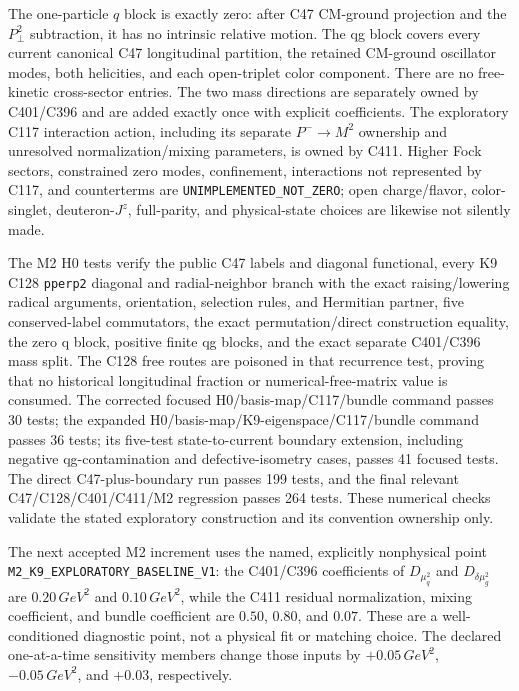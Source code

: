 \documentclass[11pt,oneside]{book}
\newcommand{\codepath}[1]{\nolinkurl{#1}}
\begin{document}
The one-particle $q$ block is exactly zero: after C47 CM-ground projection and
the $P_\perp^2$ subtraction, it has no intrinsic relative motion. The qg
block covers every current canonical C47 longitudinal partition, the retained
CM-ground oscillator modes, both helicities, and each open-triplet color
component. There are no free-kinetic cross-sector entries. The two mass
directions are separately owned by C401/C396 and are added exactly once with
explicit coefficients. The exploratory C117 interaction action, including
its separate $P^-\!\to M^2$ ownership and unresolved normalization/mixing
parameters, is owned by C411. Higher Fock sectors, constrained zero modes,
confinement, interactions not represented by C117, and counterterms are
\texttt{UNIMPLEMENTED\_NOT\_ZERO}; open charge/flavor, color-singlet,
deuteron-$J^z$, full-parity, and physical-state choices are likewise not
silently made.

The M2 H0 tests verify the public C47 labels and diagonal functional, every K9
C128 \codepath{pperp2} diagonal and radial-neighbor branch with the exact
raising/lowering radical arguments, orientation, selection rules, and
Hermitian partner, five conserved-label commutators, the exact
permutation/direct construction equality, the zero q block, positive finite
qg blocks, and the exact separate C401/C396 mass split. The C128 free routes
are poisoned in that recurrence test, proving that no historical longitudinal
fraction or numerical-free-matrix value is consumed. The corrected focused H0/basis-map/C117/bundle command
passes 30 tests; the expanded H0/basis-map/K9-eigenspace/C117/bundle command
passes 36 tests; its five-test state-to-current boundary extension, including
negative qg-contamination and defective-isometry cases, passes 41 focused
tests. The direct C47-plus-boundary run passes 199 tests, and the final
relevant C47/C128/C401/C411/M2 regression passes 264 tests. These numerical
checks validate the stated exploratory construction and its convention
ownership only.

The next accepted M2 increment uses the named, explicitly nonphysical point
\texttt{M2\_K9\_EXPLORATORY\_BASELINE\_V1}: the C401/C396 coefficients of
$D_{\mu_q^2}$ and $D_{\delta\mu_g^2}$ are $0.20\,\unit{GeV^2}$ and
$0.10\,\unit{GeV^2}$, while the C411 residual normalization, mixing
coefficient, and bundle coefficient are $0.50$, $0.80$, and $0.07$.
These are a well-conditioned diagnostic point, not a physical fit or matching
choice. The declared one-at-a-time sensitivity members change those inputs by
$+0.05\,\unit{GeV^2}$, $-0.05\,\unit{GeV^2}$, and $+0.03$, respectively.
\end{document}

